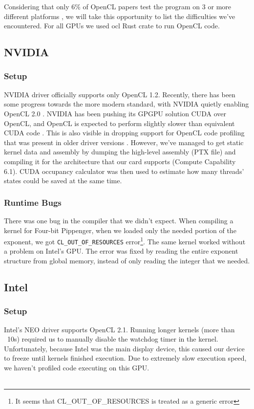 Considering that only 6\% of OpenCL papers test the program on 3 or more different platforms \cite{sorensen2016hitchhiker}, we will take this opportunity to list the difficulties we've encountered. For all GPUs we used ocl Rust crate to run OpenCL code.

\subsection{NVIDIA}
\subsubsection{Setup}
NVIDIA driver officially supports only OpenCL 1.2. Recently, there has been some progress towards the more modern standard, with NVIDIA quietly enabling OpenCL 2.0 \cite{nvidiareleasenotes}. NVIDIA has been pushing its GPGPU solution CUDA over OpenCL, and OpenCL is expected to perform slightly slower than equivalent CUDA code \cite{fang2011comprehensive, karimi2010performance}. This is also visible in dropping support for OpenCL code profiling that was present in older driver versions \cite{nvidiaprofiler}. However, we've managed to get static kernel data and assembly by dumping the high-level assembly (PTX file) and compiling it for the architecture that our card supports (Compute Capability 6.1). CUDA occupancy calculator was then used to estimate how many threads' states could be saved at the same time.
\subsubsection{Runtime Bugs}
There was one bug in the compiler that we didn't expect. When compiling a kernel for Four-bit Pippenger, when we loaded only the needed portion of the exponent, we got \texttt{CL\_OUT\_OF\_RESOURCES} error\footnote{It seems that CL\_OUT\_OF\_RESOURCES is treated as a generic error}. The same kernel worked without a problem on Intel's GPU. The error was fixed by reading the entire exponent structure from global memory, instead of only reading the integer that we needed.

\subsection{Intel}
\subsubsection{Setup}
Intel's NEO driver supports OpenCL 2.1. Running longer kernels (more than ~10s) required us to manually disable the watchdog timer in the kernel. Unfortunately, because Intel was the main display device, this caused our device to freeze until kernels finished execution. Due to extremely slow execution speed, we haven't profiled code executing on this GPU.\\\\
